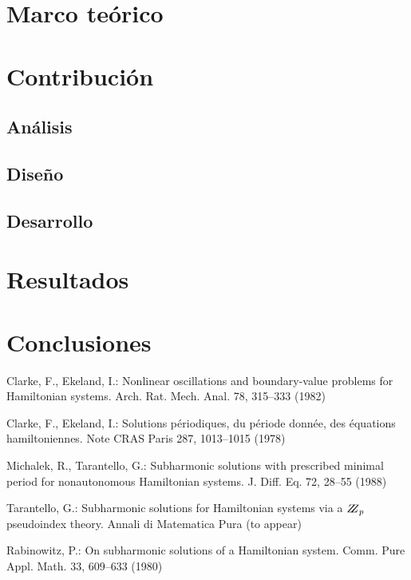 \documentclass{llncs}
\begin{document}
%
\section{Marco teórico}
%

%
\section{Contribución}
%
\subsection{Análisis}
\subsection{Diseño}
\subsection{Desarrollo}
%
\section{Resultados}
%

%
\section{Conclusiones}
%

%
\begin{thebibliography}{5}
%
Clarke, F., Ekeland, I.:
Nonlinear oscillations and
boundary-value problems for Hamiltonian systems.
Arch. Rat. Mech. Anal. 78, 315--333 (1982)

Clarke, F., Ekeland, I.:
Solutions p\'{e}riodiques, du
p\'{e}riode donn\'{e}e, des \'{e}quations hamiltoniennes.
Note CRAS Paris 287, 1013--1015 (1978)

Michalek, R., Tarantello, G.:
Subharmonic solutions with prescribed minimal
period for nonautonomous Hamiltonian systems.
J. Diff. Eq. 72, 28--55 (1988)

Tarantello, G.:
Subharmonic solutions for Hamiltonian
systems via a $\bbbz_{p}$ pseudoindex theory.
Annali di Matematica Pura (to appear)

Rabinowitz, P.:
On subharmonic solutions of a Hamiltonian system.
Comm. Pure Appl. Math. 33, 609--633 (1980)

\end{thebibliography}
\end{document}
